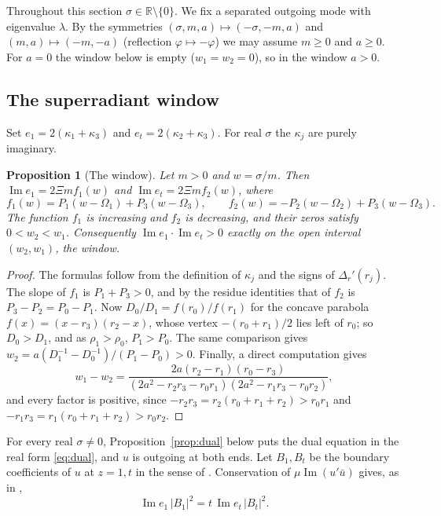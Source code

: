 \documentclass[11pt]{amsart}
\newtheorem{proposition}[theorem]{Proposition}
\theoremstyle{definition}
\theoremstyle{remark}
\numberwithin{equation}{section}
\newcommand{\R}{\mathbb{R}}
\renewcommand{\Im}{\operatorname{Im}}
\begin{document}
Throughout this section $\sigma\in\R\setminus\{0\}$. We fix a separated outgoing mode with eigenvalue $\lambda$. By
the symmetries $(\sigma,m,a)\mapsto(-\sigma,-m,a)$ and $(m,a)\mapsto(-m,-a)$ (reflection $\varphi\mapsto-\varphi$) we may assume $m\ge0$ and $a\ge0$. For $a=0$ the window below is empty ($w_1=w_2=0$), so in the window $a>0$.

\subsection{The superradiant window}\label{subsec:window}
Set $e_1=2(\kappa_1+\kappa_3)$ and $e_t=2(\kappa_2+\kappa_3)$. For real $\sigma$ the $\kappa_j$ are purely imaginary.

\begin{proposition}[The window]\label{prop:window}
Let $m>0$ and $w=\sigma/m$. Then $\Im e_1=2\Xi mf_1(w)$ and $\Im e_t=2\Xi mf_2(w)$, where
\[
f_1(w)=P_1(w-\Omega_1)+P_3(w-\Omega_3),\qquad f_2(w)=-P_2(w-\Omega_2)+P_3(w-\Omega_3).
\]
The function $f_1$ is increasing and $f_2$ is decreasing, and their zeros satisfy $0<w_2<w_1$. Consequently
$\Im e_1\cdot\Im e_t>0$ exactly on the open interval $(w_2,w_1)$, the \emph{window}.
\end{proposition}

\begin{proof}
The formulas follow from the definition of $\kappa_j$ and the signs of $\Delta_r'(r_j)$. The slope of $f_1$ is
$P_1+P_3>0$, and by the residue identities that of $f_2$ is $P_3-P_2=P_0-P_1$. Now $D_0/D_1=f(r_0)/f(r_1)$ for the
concave parabola $f(x)=(x-r_3)(r_2-x)$, whose vertex $-(r_0+r_1)/2$ lies left of $r_0$; so $D_0>D_1$, and as
$\rho_1>\rho_0$, $P_1>P_0$. The same comparison gives $w_2=a(D_1^{-1}-D_0^{-1})/(P_1-P_0)>0$. Finally, a direct computation gives
\[
w_1-w_2=\frac{2a(r_2-r_1)(r_0-r_3)}{(2a^2-r_2r_3-r_0r_1)(2a^2-r_1r_3-r_0r_2)},
\]
and every factor is positive, since $-r_2r_3=r_2(r_0+r_1+r_2)>r_0r_1$ and $-r_1r_3=r_1(r_0+r_1+r_2)>r_0r_2$.
\end{proof}

For every real $\sigma\ne0$, Proposition~\ref{prop:dual} below puts the dual equation in the real form
\eqref{eq:dual}, and $u$ is outgoing at both ends. Let $B_1,B_t$ be the boundary coefficients of $u$ at $z=1,t$ in
the sense of \cite[(3.5)]{Hin26}. Conservation of $\mu\Im(u'\bar u)$ gives, as in \cite[\S3]{Hin26},
\begin{equation}\label{eq:wronskian}
\Im e_1\,|B_1|^2=t\,\Im e_t\,|B_t|^2.
\end{equation}
\end{document}
